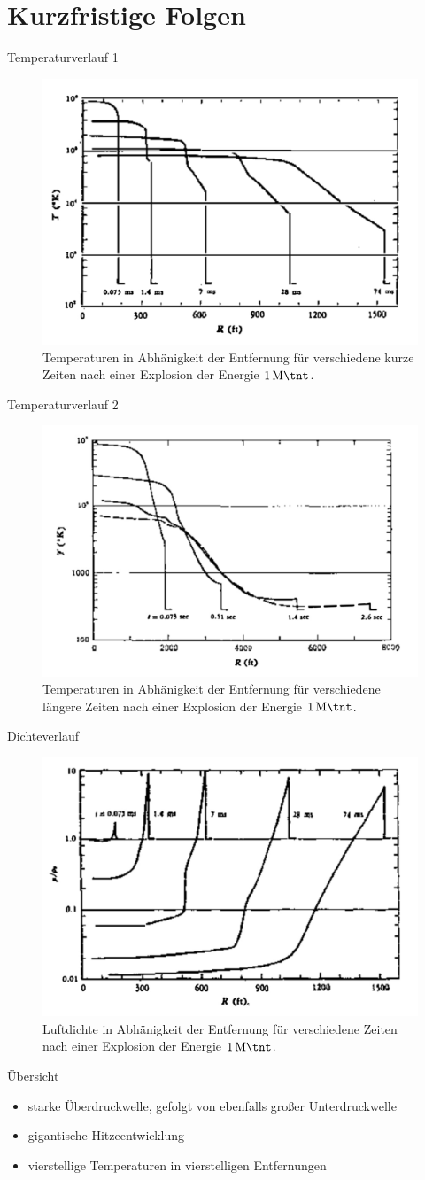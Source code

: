 \section{Kurzfristige Folgen}
\begin{frame}{Temperaturverlauf 1}
\begin{figure}
	\centering
	\includegraphics[width=0.5\linewidth]{img/img1}
	\caption{Temperaturen in Abhänigkeit der Entfernung für verschiedene kurze Zeiten nach einer Explosion der Energie $\SI{1}{\mega \tnt}$.\cite{AnnuRev18_1}}
\end{figure}
\end{frame}
\begin{frame}{Temperaturverlauf 2}
	\begin{figure}
		\centering
		\includegraphics[width=0.5\linewidth]{img/img3.jpg}
		\caption{Temperaturen in Abhänigkeit der Entfernung für verschiedene längere Zeiten nach einer Explosion der Energie $\SI{1}{\mega \tnt}$.\cite{AnnuRev18_1}}
	\end{figure}
\end{frame}
\begin{frame}{Dichteverlauf}
	\begin{figure}
		\centering
		\includegraphics[width=0.5\linewidth]{img/img2.jpg}
		\caption{Luftdichte in Abhänigkeit der Entfernung für verschiedene Zeiten nach einer Explosion der Energie $\SI{1}{\mega \tnt}$.\cite{AnnuRev18_1}}
	\end{figure}
\end{frame}
\begin{frame}{Übersicht}
	\begin{itemize}
		\item starke Überdruckwelle, gefolgt von ebenfalls großer Unterdruckwelle
		\item gigantische Hitzeentwicklung
		\item vierstellige Temperaturen in vierstelligen Entfernungen
	\end{itemize}
\end{frame}
